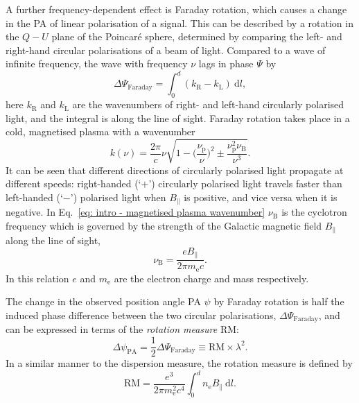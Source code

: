 A further frequency-dependent effect is Faraday rotation, which causes a change in the PA of linear polarisation of a signal. This can be described by a rotation in the $Q-U$ plane of the Poincar\'e sphere, determined by comparing the left- and right-hand circular polarisations of a beam of light. Compared to a wave of infinite frequency, the wave with frequency $\nu$ lags in phase $\Psi$ by
\begin{equation}
    \label{eq: intro - faraday rotation angle}
	\Delta\Psi_\mathrm{Faraday} = \int^d_0 (k_\mathrm{R}-k_\mathrm{L})\ \mathrm{d}l,
\end{equation}
here $k_\mathrm{R}$ and $k_\mathrm{L}$ are the wavenumbers of right- and left-hand circularly polarised light, and the integral is along the line of sight. Faraday rotation takes place in a cold, magnetised plasma with a wavenumber
\begin{equation}
    \label{eq: intro - magnetised plasma wavenumber}
    k(\nu) = \frac{2\pi}{c}\nu \sqrt{1-\bigg(\frac{\nu_\mathrm{p}}{\nu}\bigg)^2 \pm \frac{\nu_\mathrm{p}^2\nu_\mathrm{B}}{\nu^3} }.
\end{equation}
It can be seen that different directions of circularly polarised light propagate at different speeds: right-handed (`$+$') circularly polarised light travels faster than left-handed (`$-$') polarised light when $B_\parallel$ is positive, and vice versa when it is negative.
In Eq.~\eqref{eq: intro - magnetised plasma wavenumber} $\nu_\mathrm{B}$ is the cyclotron frequency which is governed by the strength of the Galactic magnetic field $B_\parallel$ along the line of sight,
\begin{equation}
    \label{eq: intro - cyclotron frequency}
	\nu_\mathrm{B} = \frac{eB_\parallel}{2\pi m_\mathrm{e}c}.
\end{equation}
In this relation $e$ and $m_\mathrm{e}$ are the electron charge and mass respectively. 

The change in the observed position angle PA $\psi$ by Faraday rotation is half the induced phase difference between the two circular polarisations, $\Delta\Psi_\mathrm{Faraday}$, and can be expressed in terms of the \textit{rotation measure} RM:
\begin{equation}
    \label{eq: intro - PA rotation angle}
	\Delta\psi_\mathrm{PA} = \frac{1}{2} \Delta\Psi_\mathrm{Faraday} \equiv \mathrm{RM} \times \lambda^2.
\end{equation}
In a similar manner to the dispersion measure, the rotation measure is defined by
\begin{equation}
    \label{eq: intro - rotation measure definition}
	\mathrm{RM} = \frac{e^3}{2\pi m_\mathrm{e}^2 c^4} \int^d_0 n_\mathrm{e}B_\parallel\ \mathrm{d}l .
\end{equation}

